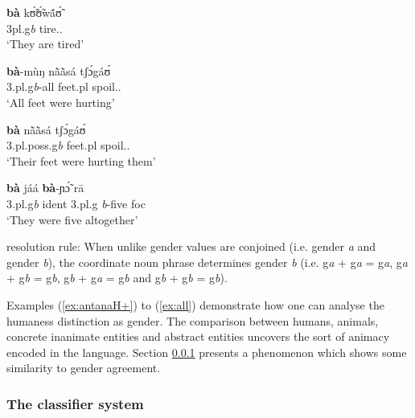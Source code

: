 \begin{exe}
\begin{exe}
\begin{exe}
{\begin{exe}
\begin{exe}
\begin{exe}
\begin{exe}
\begin{exe}
\begin{exe}
\begin{exe}
\begin{xlist}
\begin{exe}
\begin{exe}
\begin{exe}
\begin{exe}
\begin{exe}
\begin{exe}
\begin{exe}
\begin{exe}
\begin{exe}
\begin{exe}
\begin{exe}
\begin{exe}
\begin{exe}
\ex\label{ex:Tamanaphor}

\gll  \textbf{bà}  kʊ̃́ʊ̃́wã́ʊ̃́ \\
       {{\sc 3pl}.{\sc g}{\it b}} tire.{\pfv}.{\foc}\\
\glt `They are tired' \\

\ex\label{ex:Tamquant}

\gll   \textbf{bà}-mùŋ  nã̀ã̀sá tʃɔ́gáʊ́  \\
       {3.{\sc pl}.{\sc g}{\it b}-all} {feet.{\sc pl}} spoil.{\pfv}.{\foc}\\
\glt `All  feet were hurting' \\

\ex\label{ex:Tamposs}

\gll     \textbf{bà}  nã̀ã̀sá  tʃɔ́gáʊ́\\
        {{\sc 3.pl.poss.g}{\it b}}  {feet.{\sc pl}}  spoil.{\pfv}.{\foc}\\
\glt `Their feet were hurting them' \\

\ex\label{ex:Tamnum}

\gll   \textbf{bà}  jáá    \textbf{bà}-ɲɔ̃́  rā\\
        {{\sc 3.pl.g}{\it b}} {\sc ident}
{3.{\sc pl}.{\sc g}{\it
b}-five} {\sc foc} \\
\glt `They were five altogether' \\


\ex\label{ex:rule}

{\sc resolution rule}: When unlike gender values are conjoined
(i.e. {\sc gender} {\it  a} and {\sc gender} {\it b}), the
coordinate noun phrase determines {\sc gender} {\it b} (i.e.
{\sc g}{\it a} + {\sc g}{\it a} = {\sc g}{\it a},
{\sc g}{\it a} + {\sc g}{\it b} = {\sc g}{\it b},
{\sc g}{\it b} + {\sc g}{\it a} = {\sc g}{\it b} and
{\sc g}{\it b} + {\sc g}{\it b} = {\sc g}{\it b}).




\z 
 \z

Examples (\ref{ex:antanaH+}) to (\ref{ex:all}) demonstrate how one can analyse
the humaness distinction as gender. The comparison between humans, animals,
concrete inanimate entities and abstract entities uncovers the sort of animacy
encoded in the language. Section \ref{sec:classifier}  presents a phenomenon 
which
shows
some similarity to gender agreement.



\subsubsection{The classifier system}
\label{sec:classifier}


\end{exe}
\end{exe}
\end{exe}
\end{exe}
\end{exe}
\end{exe}
\end{exe}
\end{exe}
\end{exe}
\end{exe}
\end{exe}
\end{exe}
\end{exe}
\end{xlist}
\end{exe}
\end{exe}
\end{exe}
\end{exe}
\end{exe}
\end{exe}
\end{exe}}
\end{exe}
\end{exe}
\end{exe}
